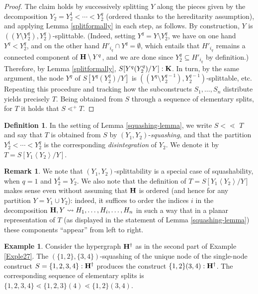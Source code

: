 \documentclass{article}
\theoremstyle{plain}
\theoremstyle{definition}
\newtheorem{definition}[thm]{Definition}
\newtheorem{remark}[thm]{Remark}
\newtheorem{example}[thm]{\sc Example}
\newcommand{\inc}{\subseteq}
\newcommand{\hyper}[1]{{\bf #1}}
\newcommand{\squash}{<\!\!\!\!\lessdot\,\,}
\begin{document}
\begin{proof} The claim holds by successively splitting $Y$ along the pieces given by the decomposition $Y_2=Y_2^1< \cdots < Y_2^q$ (ordered thanks to the hereditarity assumption), and applying Lemma \ref{splitformally} in each step, as follows. By construction, $Y$ is $((Y\setminus Y_2^q),Y_2^q)$-splittable. (Indeed, setting
$Y^q=Y\setminus Y_2^q$, we have on one hand $Y^q<Y_2^q$, and on the other hand $H'_{i_q}\cap Y^q=\emptyset$, which entails that $H'_{i_q}$ remains a connected component of $\hyper{H}\setminus Y^q$, and we are done since $Y_2^q\inc H'_{i_q}$ by definition.) Therefore, by Lemma \ref{splitformally}, $S[Y^q(Y_2^q)/Y]:{\bf K}$. In turn, by the same argument, the node $Y^q$ of $S[Y^q(Y_2^q)/Y]$ is $((Y^q\setminus Y_2^{q-1}),Y_2^{q-1})$-splittable, etc. Repeating this procedure and tracking how the subconstructs $S_1,\dots, S_n$ distribute yields precisely $T$. Being obtained from $S$ through a sequence of elementary splits, for $T$ it holds that $S\lessdot^+ T$.
\end{proof}
\begin{definition} \label{squashing-notation}
In the setting of Lemma \ref{squashing-lemma}, we write $S\squash T$ and say that $T$ is obtained from $S$ by $(Y_1,Y_2)$-{\em squashing}, and that
the partition $Y_2^1 < \cdots < Y_2^q$ is the corresponding {\em disintegration} of $Y_2$. We denote it by $T=S[Y_1\left\langle Y_2 \right\rangle/Y]$.
\end{definition}
\begin{remark}
We note that $(Y_1,Y_2)$-splittability is a special case of squashability, when $q=1$ and $Y_2^1=Y_2$.
We also note that the definition of $T=S[Y_1\left\langle Y_2 \right\rangle/Y]$ makes sense even without assuming that ${\bf H}$ is ordered (and hence for any partition $Y=Y_1\cup Y_2$): indeed, it suffices to order the indices $i$ in the decomposition ${\bf H},Y\leadsto H_1,\dots,H_i,\ldots,H_n$ in such a way that 
in a planar representation of $T$ (as displayed in the statement of Lemma \ref{squashing-lemma}) these components ``appear'' from left to right.
\end{remark}
\begin{example} Consider the hypergraph ${\bf H}^\dag$ as in the second part of Example \ref{Exple27}. 
The $(\{1,2\},\{3,4\})$-squashing of the unique node of the single-node construct $S=\{1,2,3,4\}:{\bf H}^\dag$ produces the construct $\{1,2\}(3,4):{\bf H}^\dag$. The corresponding sequence of elementary splits is $\{1,2,3,4\}\lessdot \{1,2,3\}(4)\lessdot \{1,2\}(3,4)$.
\end{example}
\end{document}
